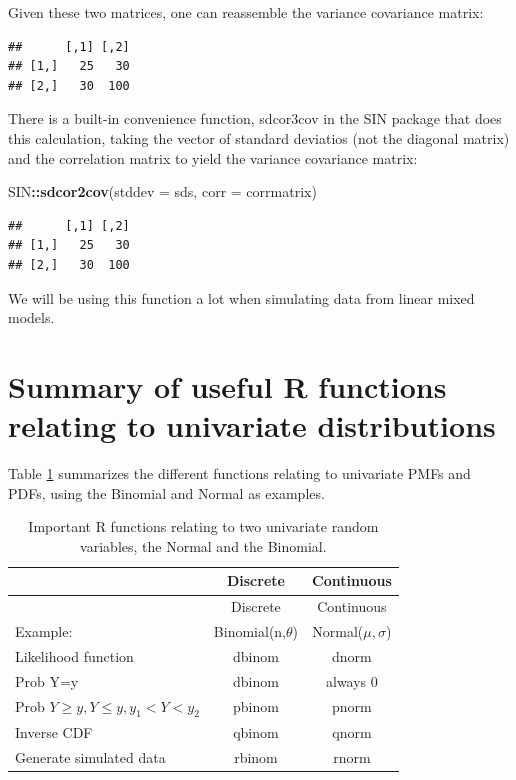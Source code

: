 \documentclass[12pt,]{krantz}
\newenvironment{Shaded}{\begin{snugshade}}{\end{snugshade}}
\newcommand{\DataTypeTok}[1]{\textcolor[rgb]{0.13,0.29,0.53}{#1}}
\newcommand{\KeywordTok}[1]{\textcolor[rgb]{0.13,0.29,0.53}{\textbf{#1}}}
\newcommand{\NormalTok}[1]{#1}
\newcommand{\OperatorTok}[1]{\textcolor[rgb]{0.81,0.36,0.00}{\textbf{#1}}}
\newcommand{\StringTok}[1]{\textcolor[rgb]{0.31,0.60,0.02}{#1}}
\begin{document}
Given these two matrices, one can reassemble the variance covariance matrix:

\begin{Shaded}
\end{Shaded}

\begin{verbatim}
##      [,1] [,2]
## [1,]   25   30
## [2,]   30  100
\end{verbatim}

There is a built-in convenience function, sdcor3cov in the SIN package that does this calculation, taking the vector of standard deviatios (not the diagonal matrix) and the correlation matrix to yield the variance covariance matrix:

\begin{Shaded}
\begin{Highlighting}[]
\NormalTok{SIN}\OperatorTok{::}\KeywordTok{sdcor2cov}\NormalTok{(}\DataTypeTok{stddev =}\NormalTok{ sds, }\DataTypeTok{corr =}\NormalTok{ corrmatrix)}
\end{Highlighting}
\end{Shaded}

\begin{verbatim}
##      [,1] [,2]
## [1,]   25   30
## [2,]   30  100
\end{verbatim}

We will be using this function a lot when simulating data from linear mixed models.

\hypertarget{summary-of-useful-r-functions-relating-to-univariate-distributions}{%
\section{Summary of useful R functions relating to univariate distributions}\label{summary-of-useful-r-functions-relating-to-univariate-distributions}}

Table \ref{tab:dpqrfunctions} summarizes the different functions relating to univariate PMFs and PDFs, using the Binomial and Normal as examples.

\begin{longtable}[]{@{}lcc@{}}
\caption{\label{tab:dpqrfunctions} Important R functions relating to two univariate random variables, the Normal and the Binomial.}\tabularnewline
\toprule
& Discrete & Continuous\tabularnewline
\midrule
\endfirsthead
\toprule
& Discrete & Continuous\tabularnewline
\midrule
\endhead
Example: & Binomial(n,\(\theta\)) & Normal(\(\mu,\sigma\))\tabularnewline
Likelihood function & dbinom & dnorm\tabularnewline
Prob Y=y & dbinom & always 0\tabularnewline
Prob \(Y\geq y, Y\leq y, y_1<Y<y_2\) & pbinom & pnorm\tabularnewline
Inverse CDF & qbinom & qnorm\tabularnewline
Generate simulated data & rbinom & rnorm\tabularnewline
\bottomrule
\end{longtable}
\end{document}
